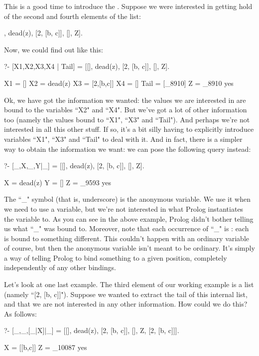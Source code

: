 This is a good time to introduce the .
Suppose we were interested in getting hold of the second and fourth
elements of the list:
\begin{LPNcodedisplay}
[[], dead(z), [2, [b, c]], [], Z].
\end{LPNcodedisplay}

Now, we could find out like this:
\begin{LPNcodedisplay}
?- [X1,X2,X3,X4 | Tail] =
            [[], dead(z), [2, [b, c]], [], Z].

X1 = []
X2 = dead(z)
X3 = [2,[b,c]]
X4 = []
Tail = [_8910]
Z = _8910
yes
\end{LPNcodedisplay}

Ok, we have got the information we wanted: the values we are
interested in are bound to the variables ``X2" and ``X4".  But
we've got a lot of other information too (namely the values bound to
``X1", ``X3" and ``Tail"). And perhaps we're not
interested in all this other stuff. If so, it's a bit silly having to
explicitly introduce variables ``X1", ``X3" and ``Tail" to
deal with it.  And in fact, there is a simpler way to obtain 
the information we want: we can pose the following query
instead:


\begin{LPNcodedisplay}
?- [_,X,_,Y|_] = [[], dead(z), [2, [b, c]], [], Z].

X = dead(z)
Y = []
Z = _9593
yes
\end{LPNcodedisplay}


The ``\_" symbol (that is, underscore) is the anonymous variable.  We
use it when we need to use a variable, but we're not interested in
what Prolog instantiates the variable to.  As you can see in the above
example, Prolog didn't bother telling us what ``\_" was bound to.
Moreover, note that each occurrence of ``\_" is :
each is bound to something different. This couldn't happen with an
ordinary variable of course, but then the anonymous variable isn't
meant to be ordinary. It's simply a way of telling Prolog to bind
something to a given position, completely independently of any other
bindings.

Let's look at one last example. The third element of our working
example is a list (namely ``[2, [b, c]]").  Suppose we
wanted to extract the tail of this internal list, and that we are not
interested in any other information.  How could we do this?  As
follows:

\begin{LPNcodedisplay}
?- [_,_,[_|X]|_] =
      [[], dead(z), [2, [b, c]], [], Z, [2, [b, c]]].

X = [[b,c]]
Z = _10087
yes
\end{LPNcodedisplay}




